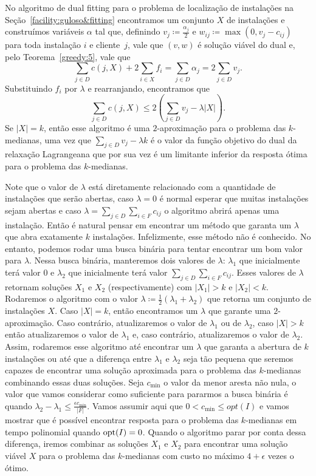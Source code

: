 No algoritmo de dual fitting para o problema de localização de instalações na Seção~\ref{facility:guloso&fitting} encontramos um conjunto $X$ de instalações e construímos variáveis $\alpha$ tal que, definindo $v_j \coloneqq \frac{\alpha_j}{2}$ e $w_{ij} \coloneqq \max(0,v_j - c_{ij})$ para toda instalação $i$ e cliente~$j$, vale que $(v, w)$ é solução viável do dual e, pelo Teorema~\ref{greedy:5}, vale que
\[\sum_{j \in D} c(j,X) + 2\sum_{i \in X} f_i = \sum_{j \in D} \alpha_j =  2\sum_{j\in D} v_j.\]
Substituindo $f_i$ por $\lambda$ e rearranjando, encontramos que
\[\sum_{j\in D} c(j,X) \leq 2\left(\sum_{j\in D}v_j - \lambda|X|\right).\]
Se $|X| = k$, então esse algoritmo é uma $2$-aproximação para o problema das $k$-medianas, uma vez que $ \sum_{j\in D} v_j - \lambda k$ é o valor da função objetivo do dual da relaxação Lagrangeana que por sua vez é um limitante inferior da resposta ótima para o problema das $k$-medianas. 

Note que o valor de $\lambda$ está diretamente relacionado com a quantidade de instalações que serão abertas, caso $\lambda = 0$ é normal esperar que muitas instalações sejam abertas e caso $\lambda = \sum_{j \in D}\sum_{i \in F}c_{ij}$ o algoritmo abrirá apenas uma instalação. Então é natural pensar em encontrar um método que garanta um $\lambda$ que abra exatamente $k$ instalações. Infelizmente, esse método não é conhecido. No entanto, podemos rodar uma busca binária para tentar encontrar um bom valor para $\lambda$. Nessa busca binária, manteremos dois valores de $\lambda$:  $\lambda_1$ que inicialmente terá valor 0 e $\lambda_2$ que inicialmente terá valor $\sum_{j \in D}\sum_{i \in F}c_{ij}$. Esses valores de $\lambda$ retornam soluções $X_1$ e $X_2$ (respectivamente) com $|X_1| > k$ e $|X_2| < k$. Rodaremos o algoritmo com o valor $\lambda \coloneqq \frac{1}{2}\left(\lambda_1 + \lambda_2 \right)$ que retorna um conjunto de instalações $X$. Caso $|X| = k$, então encontramos um $\lambda$ que garante uma $2$-aproximação. Caso contrário, atualizaremos o valor de $\lambda_1$ ou de $\lambda_2$, caso $|X| > k$ então atualizaremos o valor de $\lambda_1$ e, caso contrário, atualizaremos o valor de $\lambda_2$. Assim, rodaremos esse algoritmo até encontrar um $\lambda$ que garanta a abertura de $k$ instalações ou até que a diferença entre $\lambda_1$ e $\lambda_2$ seja tão pequena que seremos capazes de encontrar uma solução aproximada para o problema das $k$-medianas combinando essas duas soluções. Seja $c_{\min}$ o valor da menor aresta não nula, o valor que vamos considerar como suficiente para pararmos a busca binária é quando $\lambda_2 - \lambda_1 \leq \frac{\epsilon c_{\min}}{|F|}$. Vamos assumir aqui que $0 < c_{\min} \leq opt(I)$ e vamos mostrar que é possível encontrar resposta para o problema das $k$-medianas em tempo polinomial quando $\mathrm{opt}(I)=0$. Quando o algoritmo parar por conta dessa diferença, iremos combinar as soluções $X_1$ e $X_2$ para encontrar uma solução viável $X$ para o problema das $k$-medianas com custo no máximo $4 + \epsilon$ vezes o ótimo.

